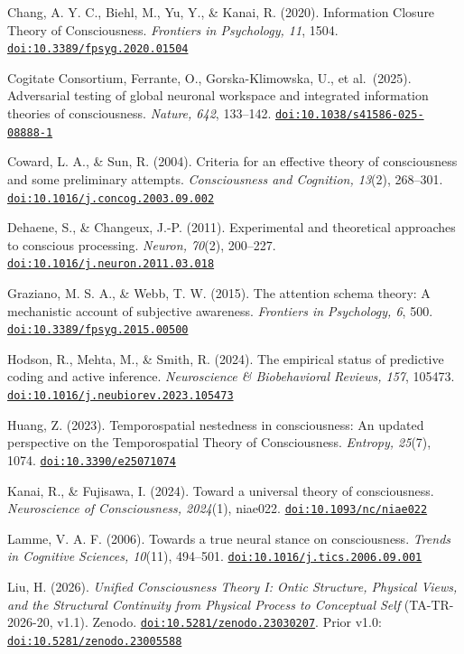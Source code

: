 \documentclass[
  11pt,
  a4paper,
]{article}
\begin{document}
Chang, A. Y. C., Biehl, M., Yu, Y., \& Kanai, R. (2020). Information
Closure Theory of Consciousness. \emph{Frontiers in Psychology, 11},
1504.
\href{https://doi.org/10.3389/fpsyg.2020.01504}{\nolinkurl{doi:10.3389/fpsyg.2020.01504}}

Cogitate Consortium, Ferrante, O., Gorska-Klimowska, U., et al.~(2025).
Adversarial testing of global neuronal workspace and integrated
information theories of consciousness. \emph{Nature, 642}, 133--142.
\href{https://doi.org/10.1038/s41586-025-08888-1}{\nolinkurl{doi:10.1038/s41586-025-08888-1}}

Coward, L. A., \& Sun, R. (2004). Criteria for an effective theory of
consciousness and some preliminary attempts. \emph{Consciousness and
Cognition, 13}(2), 268--301.
\href{https://doi.org/10.1016/j.concog.2003.09.002}{\nolinkurl{doi:10.1016/j.concog.2003.09.002}}

Dehaene, S., \& Changeux, J.-P. (2011). Experimental and theoretical
approaches to conscious processing. \emph{Neuron, 70}(2), 200--227.
\href{https://doi.org/10.1016/j.neuron.2011.03.018}{\nolinkurl{doi:10.1016/j.neuron.2011.03.018}}

Graziano, M. S. A., \& Webb, T. W. (2015). The attention schema theory:
A mechanistic account of subjective awareness. \emph{Frontiers in
Psychology, 6}, 500.
\href{https://doi.org/10.3389/fpsyg.2015.00500}{\nolinkurl{doi:10.3389/fpsyg.2015.00500}}

Hodson, R., Mehta, M., \& Smith, R. (2024). The empirical status of
predictive coding and active inference. \emph{Neuroscience \&
Biobehavioral Reviews, 157}, 105473.
\href{https://doi.org/10.1016/j.neubiorev.2023.105473}{\nolinkurl{doi:10.1016/j.neubiorev.2023.105473}}

Huang, Z. (2023). Temporospatial nestedness in consciousness: An updated
perspective on the Temporospatial Theory of Consciousness.
\emph{Entropy, 25}(7), 1074.
\href{https://doi.org/10.3390/e25071074}{\nolinkurl{doi:10.3390/e25071074}}

Kanai, R., \& Fujisawa, I. (2024). Toward a universal theory of
consciousness. \emph{Neuroscience of Consciousness, 2024}(1), niae022.
\href{https://doi.org/10.1093/nc/niae022}{\nolinkurl{doi:10.1093/nc/niae022}}

Lamme, V. A. F. (2006). Towards a true neural stance on consciousness.
\emph{Trends in Cognitive Sciences, 10}(11), 494--501.
\href{https://doi.org/10.1016/j.tics.2006.09.001}{\nolinkurl{doi:10.1016/j.tics.2006.09.001}}

Liu, H. (2026). \emph{Unified Consciousness Theory I: Ontic Structure,
Physical Views, and the Structural Continuity from Physical Process to
Conceptual Self} (TA-TR-2026-20, v1.1). Zenodo.
\href{https://doi.org/10.5281/zenodo.23030207}{\nolinkurl{doi:10.5281/zenodo.23030207}}.
Prior v1.0:
\href{https://doi.org/10.5281/zenodo.23005588}{\nolinkurl{doi:10.5281/zenodo.23005588}}
\end{document}
